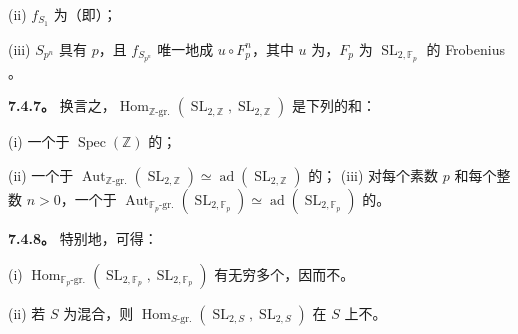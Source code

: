 (ii) $f_{S_1}$ 为（即）；

(iii) $S_{p^n}$ 具有 $p$，且 $f_{S_{p^n}}$ 唯一地成 $u\circ F_p^n$，其中 $u$ 为，$F_p$ 为 $\operatorname{SL}_{2,\mathbb F_p}$ 的 Frobenius 。

\textbf{7.4.7。} 换言之，$\operatorname{Hom}_{\mathbb Z\text{-gr.}}(\operatorname{SL}_{2,\mathbb Z},\operatorname{SL}_{2,\mathbb Z})$ 是下列的和：

(i) 一个于 $\operatorname{Spec}(\mathbb Z)$ 的；

(ii) 一个于 $\operatorname{Aut}_{\mathbb Z\text{-gr.}}(\operatorname{SL}_{2,\mathbb Z})\simeq\operatorname{ad}(\operatorname{SL}_{2,\mathbb Z})$ 的；
(iii) 对每个素数 $p$ 和每个整数 $n>0$，一个于 $\operatorname{Aut}_{\mathbb F_p\text{-gr.}}(\operatorname{SL}_{2,\mathbb F_p})\simeq\operatorname{ad}(\operatorname{SL}_{2,\mathbb F_p})$ 的。

\textbf{7.4.8。} 特别地，可得：

(i) $\operatorname{Hom}_{\mathbb F_p\text{-gr.}}(\operatorname{SL}_{2,\mathbb F_p},\operatorname{SL}_{2,\mathbb F_p})$ 有无穷多个，因而不。

(ii) 若 $S$ 为混合，则 $\operatorname{Hom}_{S\text{-gr.}}(\operatorname{SL}_{2,S},\operatorname{SL}_{2,S})$ 在 $S$ 上不。

